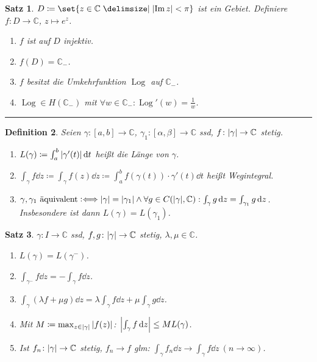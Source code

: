 \documentclass[a4paper]{article}
\newcounter{Sec}
\theoremstyle{marginbreak}
\newtheorem{definition}{Definition}[Sec]
\newtheorem{satz}[definition]{Satz}
\newcommand{\sep}{%
	\rule{\textwidth}{0.3pt}%
	\stepcounter{Sec}%
	}
\newcommand{\defiff}{\mathrel{\vcentcolon\Longleftrightarrow}}
\newcommand{\C}{\mathbb{C}}
\DeclareMathOperator{\Log}{Log}
\begin{document}
	\begin{satz}
		$D\coloneqq\set{z\in\C\given \abs{\Im z}<\pi}$ ist ein Gebiet. Definiere $f\colon D\to\C$, $z\mapsto e^z$.
		\begin{enumerate}[label=(\alph*)]
			\item $f$ ist auf $D$ injektiv.
			\item $f(D) = \C_-$.
			\item $f$ besitzt die Umkehrfunktion $\Log$ auf $\C_-$.
			\item $\Log\in H(\C_-)$ mit $\forall w\in\C_-:\Log'(w) = \frac{1}{w}$.
		\end{enumerate}
	\end{satz}
	\sep
	\begin{definition}
		Seien $\gamma\colon [a,b]\to\C$, $\gamma_1\colon[\alpha,\beta]\to\C$ ssd, $f\colon\abs{\gamma}\to\C$ stetig.
		\begin{enumerate}
			\item $L(\gamma)\coloneqq\int_a^b\abs{\gamma'(t)}\dd{t}$ heißt die Länge von $\gamma$.
			\item $\int_\gamma f\dd{z}\coloneqq \int_\gamma f(z)\dd{z}\coloneqq\int_a^bf(\gamma(t))\cdot\gamma'(t)\dd{t}$ heißt Wegintegral.
			\item $\gamma, \gamma_1~\text{äquivalent}\defiff \abs{\gamma}=\abs{\gamma_1}\wedge\forall g\in C(\abs{\gamma}, \C):
				\int_\gamma g\dd{z}=\int_{\gamma_1}g\dd{z}$. Insbesondere ist dann $L(\gamma)=L(\gamma_1)$.
		\end{enumerate}
	\end{definition}
	\begin{satz}
		$\gamma\colon I\to\C$ ssd, $f, g\colon\abs{\gamma}\to\C$ stetig, $\lambda, \mu\in\C$.
		\begin{enumerate}[label=(\alph*)]
			\item $L(\gamma)=L(\gamma^-)$.
			\item $\int_{\gamma^-}f\dd{z}=-\int_\gamma f\dd{z}$.
			\item $\int_\gamma(\lambda f+\mu g)\dd{z}=\lambda\int_\gamma f\dd{z}+\mu\int_\gamma g\dd{z}$.
			\item Mit $M\coloneqq\max_{z\in\abs{\gamma}}\abs{f(z)}$: $\abs{\int_\gamma f\dd{z}}\leq ML(\gamma)$.
			\item Ist $f_n\colon\abs{\gamma}\to\C$ stetig, $f_n\to f$ glm: $\int_\gamma f_n\dd{z}\to\int_\gamma f\dd{z}~(n\to\infty)$.
		\end{enumerate}
	\end{satz}
\end{document}
